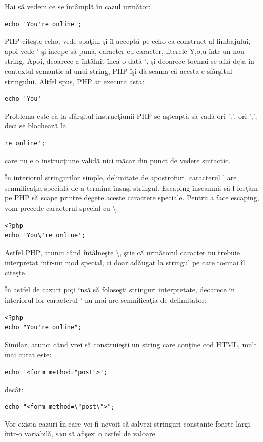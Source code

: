 Hai să vedem ce se întâmplă în cazul următor:
\begin{lstlisting}
echo 'You're online';
\end{lstlisting}
PHP citeşte {\glqq}echo{\grqq}, vede spaţiul şi îl acceptă pe {\glqq}echo{\grqq}
ca construct al limbajului, apoi vede ' şi începe să
pună, caracter cu caracter, literele Y,o,u într-un nou string.
Apoi, deoarece a întâlnit încă o dată ', şi deoarece tocmai se află
deja in contextul semantic al unui string, PHP îşi dă seama că
acesta e sfârşitul stringului. Altfel spus, PHP ar executa asta:
\begin{lstlisting}
echo 'You'
\end{lstlisting}
Problema este că la sfârşitul instrucţiunii PHP se aşteaptă să
vadă ori ',', ori ';', deci se blochează la
\begin{lstlisting}
re online';
\end{lstlisting}
care nu e o instrucţiune validă nici măcar din punct
de vedere sintactic.

În interiorul stringurilor
simple, delimitate de apostrofuri, caracterul ' are semnificaţia
specială de a termina însuşi stringul.
Escaping înseamnă să-l forţăm pe PHP să {\glqq}scape printre degete{\grqq}
aceste caractere speciale. Pentru a face escaping, vom precede caracterul
special cu \textbackslash:
\begin{lstlisting}
<?php
echo 'You\'re online';
\end{lstlisting}
Astfel PHP, atunci când întâlneşte \textbackslash, ştie că
următorul caracter nu trebuie interpretat într-un {\glqq}mod special{\grqq},
ci doar adăugat la stringul pe care tocmai îl citeşte.

În astfel de cazuri poţi însă să foloseşti stringuri interpretate,
deoarece în interiorul lor caracterul ' nu mai are semnificaţia de
delimitator:
\begin{lstlisting}
<?php
echo "You're online";
\end{lstlisting}

Similar, atunci când vrei să construieşti un string care conţine
cod HTML, mult mai curat este:
\begin{lstlisting}
echo '<form method="post">';
\end{lstlisting}
decât:
\begin{lstlisting}
echo "<form method=\"post\">";
\end{lstlisting}



Vor exista cazuri în care vei fi nevoit să salvezi stringuri constante
foarte largi într-o variabilă, sau să afişezi o astfel de valoare.

